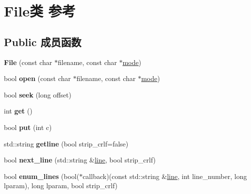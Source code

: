 \hypertarget{class_file}{}\section{File类 参考}
\label{class_file}
\subsection*{Public 成员函数}
\begin{DoxyCompactItemize}
\item 
\mbox{\label{class_file_ae536e1722532ad6411e9e8471fa70210}} 
{\bfseries File} (const char $\ast$filename, const char $\ast$\hyperlink{interfacevoid}{mode})
\item 
\mbox{\label{class_file_ab6376a46cc6c1ff56dbacf74f80b428c}} 
bool {\bfseries open} (const char $\ast$filename, const char $\ast$\hyperlink{interfacevoid}{mode})
\item 
\mbox{\label{class_file_a445ea4d6513d8c840045902bef0a9383}} 
bool {\bfseries seek} (long offset)
\item 
\mbox{\label{class_file_a48225624b579be1ad48ef0ba1509114d}} 
int {\bfseries get} ()
\item 
\mbox{\label{class_file_aba6905dc6552ffb515787f08c209ff69}} 
bool {\bfseries put} (int c)
\item 
\mbox{\label{class_file_a19c6f485e2d6df8cf6d1dc7ea7ed7679}} 
std\+::string {\bfseries getline} (bool strip\+\_\+crlf=false)
\item 
\mbox{\label{class_file_a0d305a33602c3aa0bffa7a0150f828fe}} 
bool {\bfseries next\+\_\+line} (std\+::string \&\hyperlink{structline}{line}, bool strip\+\_\+crlf)
\item 
\mbox{\label{class_file_a9dde74765871f111319ec9bd8282f4c2}} 
bool {\bfseries enum\+\_\+lines} (bool($\ast$callback)(const std\+::string \&\hyperlink{structline}{line}, int line\+\_\+number, long lparam), long lparam, bool strip\+\_\+crlf)
\item 
\mbox{\label{class_file_a9b4f49c8947ea67aa5343640af8255c1}} 

\end{DoxyCompactItemize}
